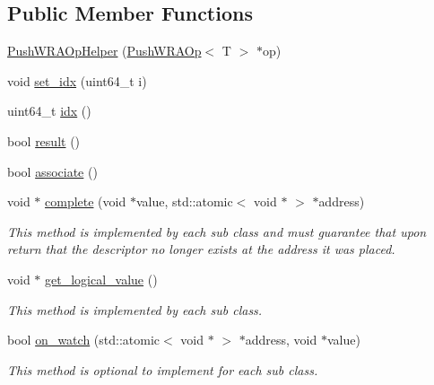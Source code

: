 \subsection*{Public Member Functions}
\begin{DoxyCompactItemize}
\item 
\hyperlink{classtervel_1_1containers_1_1wf_1_1vector_1_1_push_w_r_a_op_helper_a3fe26df430b7d5a1102f6871e1166a85}{Push\+W\+R\+A\+Op\+Helper} (\hyperlink{classtervel_1_1containers_1_1wf_1_1vector_1_1_push_w_r_a_op}{Push\+W\+R\+A\+Op}$<$ T $>$ $\ast$op)
\item 
void \hyperlink{classtervel_1_1containers_1_1wf_1_1vector_1_1_push_w_r_a_op_helper_a368ab8ad0b4b8470b201995a6f12a226}{set\+\_\+idx} (uint64\+\_\+t i)
\item 
uint64\+\_\+t \hyperlink{classtervel_1_1containers_1_1wf_1_1vector_1_1_push_w_r_a_op_helper_a9b08e8d16012894c0ec04aa92bbde2d1}{idx} ()
\item 
bool \hyperlink{classtervel_1_1containers_1_1wf_1_1vector_1_1_push_w_r_a_op_helper_ab72ec790d16af1a786039289a61e135e}{result} ()
\item 
bool \hyperlink{classtervel_1_1containers_1_1wf_1_1vector_1_1_push_w_r_a_op_helper_aea01bbb42a32ca5bb4d0a27c9158c81a}{associate} ()
\item 
void $\ast$ \hyperlink{classtervel_1_1containers_1_1wf_1_1vector_1_1_push_w_r_a_op_helper_a77a582be1e79950c4de106e031d5fa1c}{complete} (void $\ast$value, std\+::atomic$<$ void $\ast$ $>$ $\ast$address)
\begin{DoxyCompactList}\small\item\em This method is implemented by each sub class and must guarantee that upon return that the descriptor no longer exists at the address it was placed. \end{DoxyCompactList}\item 
void $\ast$ \hyperlink{classtervel_1_1containers_1_1wf_1_1vector_1_1_push_w_r_a_op_helper_a2c1c6135378bd516be4a147d7e9a61a5}{get\+\_\+logical\+\_\+value} ()
\begin{DoxyCompactList}\small\item\em This method is implemented by each sub class. \end{DoxyCompactList}\item 
bool \hyperlink{classtervel_1_1containers_1_1wf_1_1vector_1_1_push_w_r_a_op_helper_ab330b531d19d3ef8c8b86e239ce22215}{on\+\_\+watch} (std\+::atomic$<$ void $\ast$ $>$ $\ast$address, void $\ast$value)
\begin{DoxyCompactList}\small\item\em This method is optional to implement for each sub class. \end{DoxyCompactList}\end{DoxyCompactItemize}
